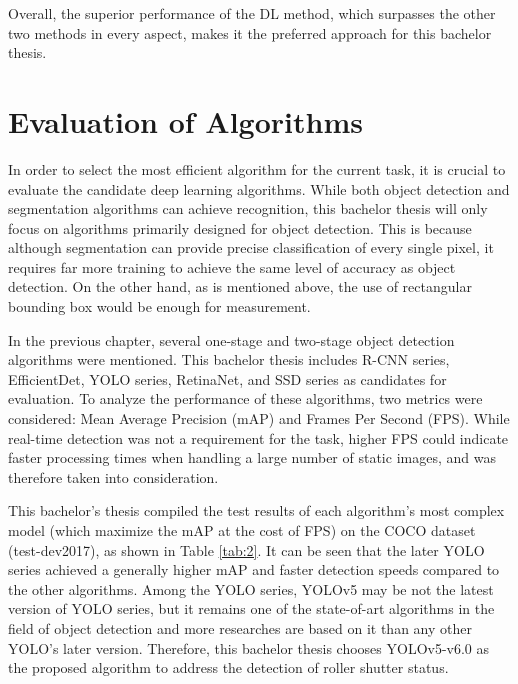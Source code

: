 Overall, the superior performance of the DL method, which surpasses the other two methods in every aspect, makes it the preferred approach for this bachelor thesis.

\section{Evaluation of Algorithms}

In order to select the most efficient algorithm for the current task, it is crucial to evaluate the candidate deep learning algorithms. While both object detection and segmentation algorithms can achieve recognition, this bachelor thesis will only focus on algorithms primarily designed for object detection. This is because although segmentation can provide precise classification of every single pixel, it requires far more training to achieve the same level of accuracy as object detection. On the other hand, as is mentioned above, the use of rectangular bounding box would be enough for measurement. 

In the previous chapter, several one-stage and two-stage object detection algorithms were mentioned. This bachelor thesis includes R-CNN series, EfficientDet, YOLO series, RetinaNet, and SSD series as candidates for evaluation. To analyze the performance of these algorithms, two metrics were considered: Mean Average Precision (mAP) and Frames Per Second (FPS). While real-time detection was not a requirement for the task, higher FPS could indicate faster processing times when handling a large number of static images, and was therefore taken into consideration.

This bachelor's thesis compiled the test results of each algorithm's most complex model (which maximize the mAP at the cost of FPS) on the COCO dataset (test-dev2017), as shown in Table \ref{tab:2}. It can be seen that the later YOLO series achieved a generally higher mAP and faster detection speeds compared to the other algorithms. Among the YOLO series, YOLOv5 may be not the latest version of YOLO series, but it remains one of the state-of-art algorithms in the field of object detection and more researches are based on it than any other YOLO's later version. Therefore, this bachelor thesis chooses YOLOv5-v6.0 as the proposed algorithm to address the detection of roller shutter status.

